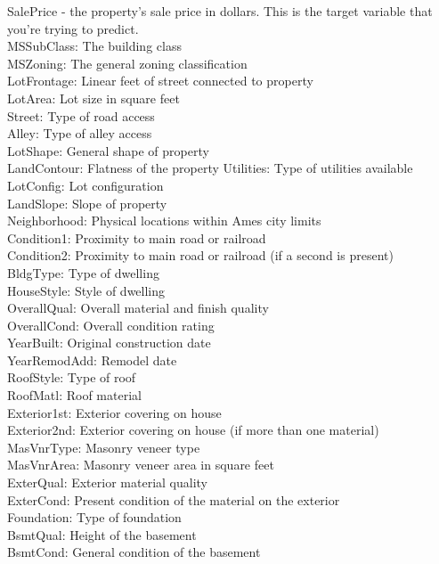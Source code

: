 \documentclass[onecolumn]{article}
\begin{document}
\begin{multicols}{3}
\noindent \footnotesize{SalePrice - the property's sale price in dollars. This is the target variable that you're trying to predict.
\\MSSubClass: The building class
\\MSZoning: The general zoning classification
\\LotFrontage: Linear feet of street connected to property
\\LotArea: Lot size in square feet
\\Street: Type of road access
\\Alley: Type of alley access
\\LotShape: General shape of property
\\LandContour: Flatness of the property
Utilities: Type of utilities available
\\LotConfig: Lot configuration
\\LandSlope: Slope of property
\\Neighborhood: Physical locations within Ames city limits
\\Condition1: Proximity to main road or railroad
\\Condition2: Proximity to main road or railroad (if a second is present)
\\BldgType: Type of dwelling
\\HouseStyle: Style of dwelling
\\OverallQual: Overall material and finish quality
\\OverallCond: Overall condition rating
\\YearBuilt: Original construction date
\\YearRemodAdd: Remodel date
\\RoofStyle: Type of roof
\\RoofMatl: Roof material
\\Exterior1st: Exterior covering on house
\\Exterior2nd: Exterior covering on house (if more than one material)
\\MasVnrType: Masonry veneer type
\\MasVnrArea: Masonry veneer area in square feet
\\ExterQual: Exterior material quality
\\ExterCond: Present condition of the material on the exterior
\\Foundation: Type of foundation
\\BsmtQual: Height of the basement
\\BsmtCond: General condition of the basement
}
\end{multicols}
\end{document}
